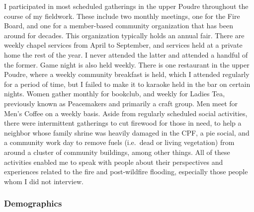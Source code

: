 \documentclass[
]{article}
\begin{document}
I participated in most scheduled gatherings in the upper Poudre throughout the course of my fieldwork. These include two monthly meetings, one for the Fire Board, and one for a member-based community organization that has been around for decades. This organization typically holds an annual fair. There are weekly chapel services from April to September, and services held at a private home the rest of the year. I never attended the latter and attended a handful of the former. Game night is also held weekly. There is one restaurant in the upper Poudre, where a weekly community breakfast is held, which I attended regularly for a period of time, but I failed to make it to karaoke held in the bar on certain nights. Women gather monthly for bookclub, and weekly for Ladies Tea, previously known as Peacemakers and primarily a craft group. Men meet for Men's Coffee on a weekly basis. Aside from regularly scheduled social activities, there were intermittent gatherings to cut firewood for those in need, to help a neighbor whose family shrine was heavily damaged in the CPF, a pie social, and a community work day to remove fuels (i.e.~dead or living vegetation) from around a cluster of community buildings, among other things. All of these activities enabled me to speak with people about their perspectives and experiences related to the fire and post-wildfire flooding, especially those people whom I did not interview.

\subsubsection{Demographics}\label{demographics}
\end{document}
